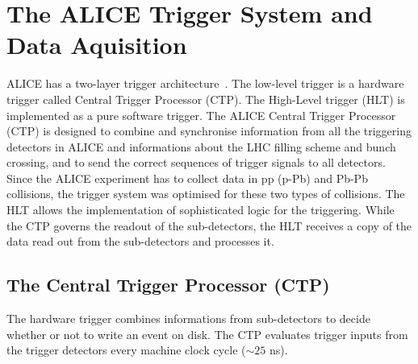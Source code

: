 \section{The ALICE Trigger System and Data Aquisition}
\label{sec:trigger}
ALICE has a two-layer trigger architecture~\cite{Fabjan:684651}. The low-level trigger is a 
hardware trigger called Central Trigger Processor (CTP). The High-Level trigger (HLT)
 is implemented as a pure software trigger. 
The ALICE Central Trigger Processor (CTP) is designed to combine and synchronise 
information from all the triggering detectors in ALICE and informations about the LHC filling scheme and
bunch crossing, and to send the correct sequences
 of trigger signals to all detectors. Since the ALICE 
 experiment has to collect data in pp (p-Pb) and Pb-Pb collisions, the trigger system was optimised 
 for these two types of collisions. The HLT allows the implementation of sophisticated 
 logic for the triggering. While the CTP governs the readout of the sub-detectors, the 
 HLT receives a copy of the data read out from the sub-detectors and processes it.

\subsection{The Central Trigger Processor (CTP)}
\label{sec:CTP}
The hardware trigger combines informations from sub-detectors to decide whether or 
not to write an event on disk. The CTP evaluates trigger inputs from the trigger detectors every machine clock cycle ($\sim25$ ns). 

